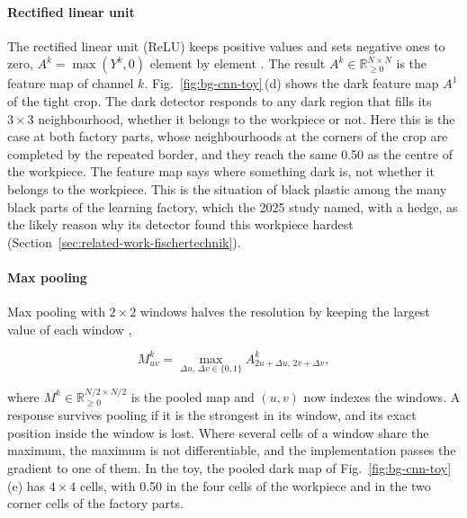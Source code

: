 \paragraph{Rectified linear unit}
The rectified linear unit (ReLU) keeps positive values and sets negative ones to zero,
$A^k = \max(Y^k, 0)$ element by element \citep[Sec.~6.3.1]{goodfellow2016deep}. The result
$A^k \in \mathbb{R}_{\ge 0}^{N \times N}$ is the feature map of channel $k$.
Fig.~\ref{fig:bg-cnn-toy}\,(d) shows the dark feature map $A^1$ of the tight crop. The
dark detector responds to any dark region that fills its $3 \times 3$ neighbourhood,
whether it belongs to the workpiece or not. Here this is the case at both factory parts,
whose neighbourhoods at the corners of the crop are completed by the repeated border,
and they reach the same 0.50 as the centre of the workpiece. The feature map says where
something dark is, not whether it belongs to the workpiece. This is the situation of
black plastic among the many black parts of the learning factory, which the 2025 study
named, with a hedge, as the likely reason why its detector found this workpiece hardest
(Section~\ref{sec:related-work-fischertechnik}).

\paragraph{Max pooling}
Max pooling with $2 \times 2$ windows halves the resolution by keeping the largest value
of each window \citep[Sec.~9.3]{goodfellow2016deep},

\begin{equation}
M^k_{uv} = \max_{\Delta u,\,\Delta v \in \{0, 1\}} A^k_{2u+\Delta u,\,2v+\Delta v},
\label{eq:bg-maxpool}
\end{equation}

where $M^k \in \mathbb{R}_{\ge 0}^{N/2 \times N/2}$ is the pooled map and $(u, v)$ now
indexes the windows. A response survives pooling if it is the strongest in its window,
and its exact position inside the window is lost. Where several cells of a window share
the maximum, the maximum is not differentiable, and the implementation passes the
gradient to one of them. In the toy, the pooled dark map of
Fig.~\ref{fig:bg-cnn-toy}\,(e) has $4 \times 4$ cells, with 0.50 in the four cells of the
workpiece and in the two corner cells of the factory parts.

